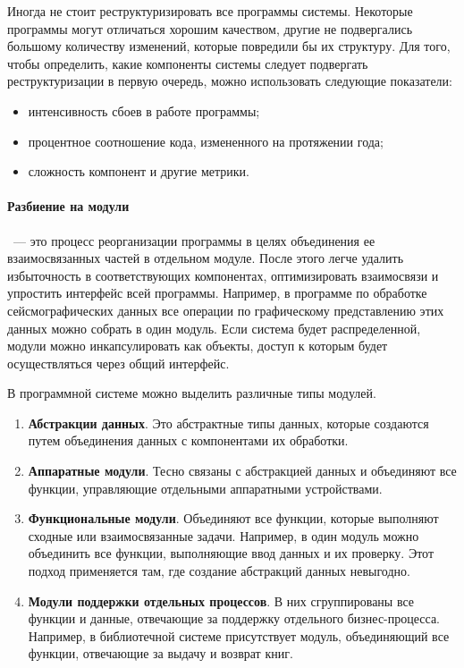 \documentclass{../../text-style}
\begin{document}
Иногда не стоит реструктуризировать все программы системы. Некоторые программы могут отличаться хорошим качеством, другие не подвергались большому количеству изменений, которые повредили бы их структуру. Для того, чтобы определить, какие компоненты системы следует подвергать реструктуризации в первую очередь, можно использовать следующие показатели:

\begin{itemize}
    \item интенсивность сбоев в работе программы;
    \item процентное соотношение кода, измененного на протяжении года;
    \item сложность компонент и другие метрики.
\end{itemize}

\paragraph{Разбиение на модули}~--- это процесс реорганизации программы в целях объединения ее взаимосвязанных частей в отдельном модуле. После этого легче удалить избыточность в соответствующих компонентах, оптимизировать взаимосвязи и упростить интерфейс всей программы. Например, в программе по обработке сейсмографических данных все операции по графическому представлению этих данных можно собрать в один модуль. Если система будет распределенной, модули можно инкапсулировать как объекты, доступ к которым будет осуществляться через общий интерфейс.

В программной системе можно выделить различные типы модулей.

\begin{enumerate}
    \item \textbf{Абстракции данных}. Это абстрактные типы данных, которые создаются путем объединения данных с компонентами их обработки. 
    \item \textbf{Аппаратные модули}. Тесно связаны с абстракцией данных и объединяют все функции, управляющие отдельными аппаратными устройствами.
    \item \textbf{Функциональные модули}. Объединяют все функции, которые выполняют сходные или взаимосвязанные задачи. Например, в один модуль можно объединить все функции, выполняющие ввод данных и их проверку. Этот подход применяется там, где создание абстракций данных невыгодно.
    \item \textbf{Модули поддержки отдельных процессов}. В них сгруппированы все функции и данные, отвечающие за поддержку отдельного бизнес-процесса. Например, в библиотечной системе присутствует модуль, объединяющий все функции, отвечающие за выдачу и возврат книг.
\end{enumerate}
\end{document}
